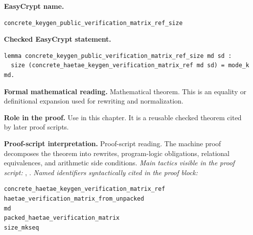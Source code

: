 \begin{formaltheorem}
\noindent\textbf{EasyCrypt name.}
\begin{lstlisting}[language=EasyCrypt,basicstyle=\ttfamily\scriptsize]
concrete_keygen_public_verification_matrix_ref_size
\end{lstlisting}
\noindent\textbf{Checked EasyCrypt statement.}
\begin{lstlisting}[language=EasyCrypt,basicstyle=\ttfamily\scriptsize]
lemma concrete_keygen_public_verification_matrix_ref_size md sd :
  size (concrete_haetae_keygen_verification_matrix_ref md sd) = mode_k md.
\end{lstlisting}
\noindent\textbf{Formal mathematical reading.}
Mathematical theorem. This is an equality or definitional expansion used for rewriting and normalization.

\noindent\textbf{Role in the proof.}
Use in this chapter. It is a reusable checked theorem cited by later proof scripts.

\noindent\textbf{Proof-script interpretation.}
Proof-script reading. The machine proof decomposes the theorem into rewrites, program-logic obligations, relational equivalences, and arithmetic side conditions.
\emph{Main tactics visible in the proof script:} , .
\emph{Named identifiers syntactically cited in the proof block:}
\begin{lstlisting}[language=EasyCrypt,basicstyle=\ttfamily\scriptsize]
concrete_haetae_keygen_verification_matrix_ref
haetae_verification_matrix_from_unpacked
md
packed_haetae_verification_matrix
size_mkseq
\end{lstlisting}

\end{formaltheorem}

